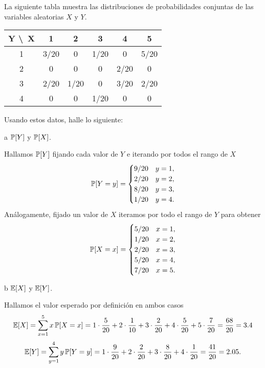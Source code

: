 \begin{statement}{2}
  La siguiente tabla muestra las distribuciones de probabilidades conjuntas
  de las variables aleatorias $X$ y $Y$.
  \begin{center}
    \begin{tabular}{ | c | c | c | c | c | c | }
      \hline
      Y \textbackslash \, X & 1 & 2 & 3 & 4 & 5 \\ \hline
      1 & 3/20 & 0 & 1/20 & 0 & 5/20 \\ \hline
      2 & 0 & 0 & 0 & 2/20 & 0 \\ \hline
      3 & 2/20 & 1/20 & 0 & 3/20 & 2/20 \\ \hline
      4 & 0 & 0 & 1/20 & 0 & 0 \\
      \hline
    \end{tabular}
  \end{center}
  Usando estos datos, halle lo siguiente:
\end{statement}

\begin{statement}{a}
  $\mathbb{P}[Y]$ y $\mathbb{P}[X]$.
\end{statement}

\begin{solution}
  Hallamos $\mathbb{P}[Y]$ fijando cada valor de $Y$ e iterando por todos el rango de $X$
  \[
    \mathbb{P}[Y = y] = \begin{cases}
      9/20 & y = 1,\\
      2/20 & y = 2,\\
      8/20 & y = 3,\\
      1/20 & y = 4.
    \end{cases}
  \]
  An\'alogamente, fijado un valor de $X$ iteramos por todo el rango de $Y$ para obtener
  \[
    \mathbb{P}[X = x] = \begin{cases}
      5/20 & x = 1,\\
      1/20 & x = 2,\\
      2/20 & x = 3,\\
      5/20 & x = 4,\\
      7/20 & x = 5.
    \end{cases}  
  \]
\end{solution}

\begin{statement}{b}
  $\mathbb{E}[X]$ y $\mathbb{E}[Y]$.
\end{statement}

\begin{solution}
  Hallamos el valor esperado por definici\'on en ambos casos
  \[
    \mathbb{E}[X] = \sum_{x = 1}^5 x \, \mathbb{P}[X = x] =
    1 \cdot \frac{5}{20} +
    2 \cdot \frac{1}{10} +
    3 \cdot \frac{2}{20} +
    4 \cdot \frac{5}{20} +
    5 \cdot \frac{7}{20} =
    \frac{68}{20} = 3.4
  \]
  \[
    \mathbb{E}[Y] = \sum_{y = 1}^4 y \, \mathbb{P}[Y = y] =
    1 \cdot \frac{9}{20} +
    2 \cdot \frac{2}{20} +
    3 \cdot \frac{8}{20} +
    4 \cdot \frac{1}{20} =
    \frac{41}{20} = 2.05.
  \]
\end{solution}

